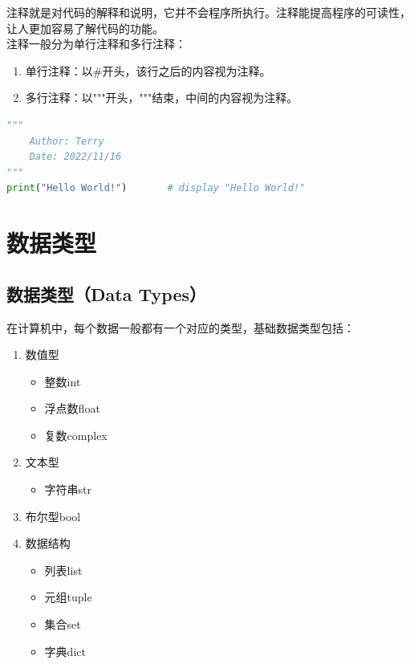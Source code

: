注释就是对代码的解释和说明，它并不会程序所执行。注释能提高程序的可读性，让人更加容易了解代码的功能。\\

注释一般分为单行注释和多行注释：

\begin{enumerate}
	\item 单行注释：以\#开头，该行之后的内容视为注释。
	\item 多行注释：以"""开头，"""结束，中间的内容视为注释。
\end{enumerate}

\vspace{0.5cm}


\begin{lstlisting}[language=Python]
"""
    Author: Terry
    Date: 2022/11/16
"""
print("Hello World!")       # display "Hello World!"
\end{lstlisting}

\newpage

\section{数据类型}

\subsection{数据类型（Data Types）}

在计算机中，每个数据一般都有一个对应的类型，基础数据类型包括：

\begin{enumerate}
	\item 数值型
	      \begin{itemize}
		      \item 整数int
		      \item 浮点数float
		      \item 复数complex
	      \end{itemize}

	\item 文本型
	      \begin{itemize}
		      \item 字符串str
	      \end{itemize}

	\item 布尔型bool

	\item 数据结构
	      \begin{itemize}
		      \item 列表list
		      \item 元组tuple
		      \item 集合set
		      \item 字典dict
	      \end{itemize}
\end{enumerate}


